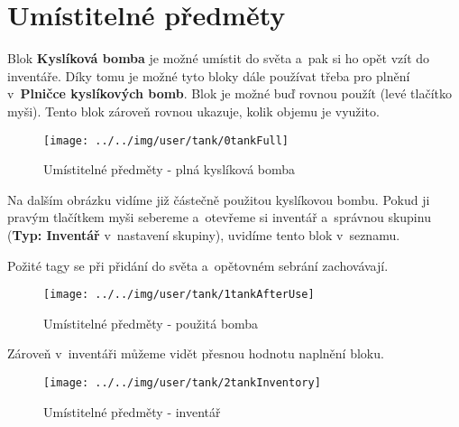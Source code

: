 
\section{Umístitelné předměty}

Blok \textbf{Kyslíková bomba} je možné umístit do světa a~pak si ho opět vzít do inventáře. Díky tomu je možné tyto bloky dále používat třeba pro plnění v~\textbf{Plničce kyslíkových bomb}.
Blok je možné buď rovnou použít (levé tlačítko myši).
Tento blok zároveň rovnou ukazuje, kolik objemu je využito.

\begin{figure}[!ht]\centering
\texttt{[image: ../../img/user/tank/0tankFull]}

\caption{Umístitelné předměty - plná kyslíková bomba}
\label{fig:user_tank_0tankFull}

\end{figure}

\FloatBarrier

Na dalším obrázku vidíme již částečně použitou kyslíkovou bombu. Pokud ji pravým tlačítkem myši sebereme a~otevřeme si inventář a~správnou skupinu (\textbf{Typ: Inventář} v~nastavení skupiny), uvidíme tento blok v~seznamu.

Požité tagy se při přidání do světa a~opětovném sebrání zachovávají.

\begin{figure}[!ht]\centering
\texttt{[image: ../../img/user/tank/1tankAfterUse]}

\caption{Umístitelné předměty - použitá bomba}
\label{fig:user_tank_1tankAfterUse}

\end{figure}

\FloatBarrier

Zároveň v~inventáři můžeme vidět přesnou hodnotu naplnění bloku.

\begin{figure}[!ht]\centering
\texttt{[image: ../../img/user/tank/2tankInventory]}

\caption{Umístitelné předměty - inventář}
\label{fig:user_tank_2tankInventory}

\end{figure}



\FloatBarrier